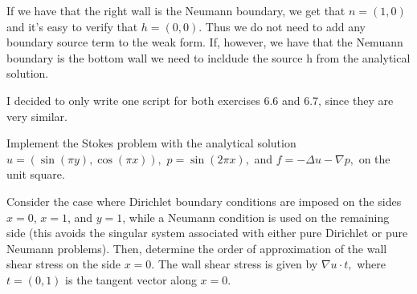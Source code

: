 \documentclass[a4paper,12pt]{article}
\theoremstyle{exerciseStyle}
\theoremstyle{solutionStyle}
\begin{document}
\begin{solution}{6.6}
    If we have that the right wall is the Neumann boundary, we get that
    \(n = (1,0) \) and it's easy to verify that \(h = (0, 0)\). Thus we
    do not need to add any boundary source term to the weak form.
    If, however, we have that the Nemuann boundary is the bottom wall we need to incldude
    the source h from the analytical solution.

    I decided to only write one script for both exercises 6.6 and 6.7, since they are very similar.
\end{solution}

\begin{exercise}{6.7}
    Implement the Stokes problem with the analytical solution
    \(
    u = \left( \sin(\pi y), \cos(\pi x) \right),
    \)
    \(
    p = \sin(2\pi x),
    \)
    and
    \(
    f = -\Delta u - \nabla p,
    \)
    on the unit square.

    Consider the case where Dirichlet boundary conditions are imposed on the sides \(x=0\), \(x=1\), and \(y=1\), while a Neumann condition is used on the remaining side (this avoids the singular system associated with either pure Dirichlet or pure Neumann problems). Then, determine the order of approximation of the wall shear stress on the side \(x=0\). The wall shear stress is given by
    \(
    \nabla u \cdot t,
    \)
    where \(t = (0,1)\) is the tangent vector along \(x=0\).
\end{exercise}
\end{document}
